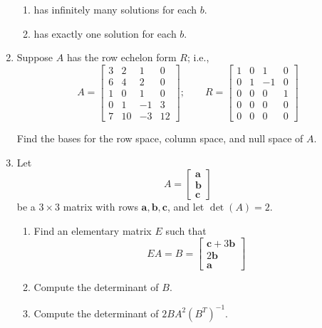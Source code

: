\documentclass[14pt]{amsart}
\begin{document}
\begin{enumerate}
\begin{enumerate}

\item  has infinitely many solutions for each $b$.

\item  has exactly one solution for each $b$.

\end{enumerate}

\item  Suppose $A$ has the row echelon form $R$; i.e.,
%
\begin{equation*}
A = \begin{bmatrix}
3 & 2 & 1 & 0\\
6 & 4 & 2 & 0\\
1 & 0 & 1 & 0\\
0 & 1 & -1 & 3\\
7 & 10 & -3 & 12
\end{bmatrix};\qquad R = \begin{bmatrix}
1 & 0 & 1 & 0\\
0 & 1 & -1 & 0\\
0 & 0 & 0 & 1\\
0 & 0 & 0 & 0\\
0 & 0 & 0 & 0
\end{bmatrix}
\end{equation*}

Find the bases for the row space, column space, and null space of $A$.

\item  Let
%
\begin{equation*}
A = \begin{bmatrix}
\textbf{a}\\
\textbf{b}\\
\textbf{c}
\end{bmatrix}
\end{equation*}
%
be a $3 \times 3$ matrix with rows $\textbf{a}, \textbf{b}, \textbf{c}$, and let $\det(A) = 2$.

\begin{enumerate}

\item  Find an elementary matrix $E$ such that
%
\begin{equation*}
EA = B = \begin{bmatrix}
\textbf{c} + 3\textbf{b}\\
2\textbf{b}\\
\textbf{a}
\end{bmatrix}
\end{equation*}

\item  Compute the determinant of $B$.

\item  Compute the determinant of $2BA^2(B^T)^{-1}$.

\end{enumerate}

\end{enumerate}
\end{document}
